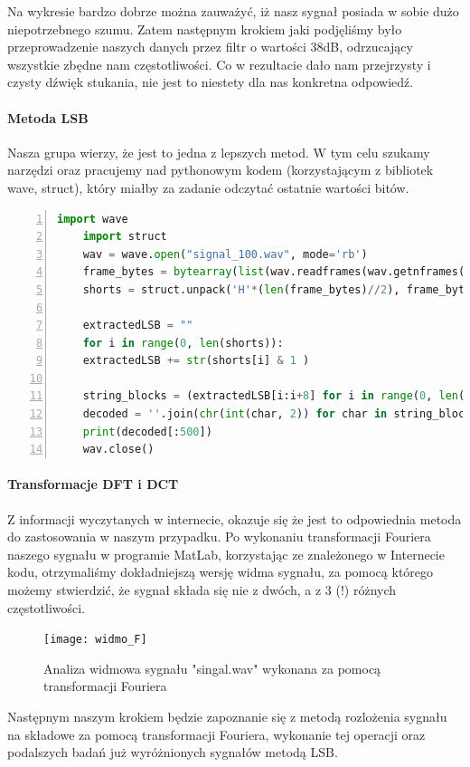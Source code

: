 \documentclass[a4paper,titleauthor]{mwart}
\begin{document}
	Na wykresie bardzo dobrze można zauważyć, iż nasz sygnał posiada w sobie dużo niepotrzebnego szumu. Zatem następnym krokiem jaki podjęliśmy było przeprowadzenie naszych danych przez filtr o wartości 38dB, odrzucający wszystkie zbędne nam częstotliwości. Co w rezultacie dało nam przejrzysty i czysty dźwięk stukania, nie jest to niestety dla nas konkretna odpowiedź. 
	
	\paragraph{Metoda LSB} Nasza grupa wierzy, że jest to jedna z lepszych metod. W tym celu szukamy narzędzi oraz pracujemy nad pythonowym kodem (korzystającym z bibliotek wave, struct), który miałby za zadanie odczytać ostatnie wartości bitów.
	
	\begin{lstlisting}[label=lst:wydruk,caption={Nasz dotychczasowy kod},language=Python,numbers=left]
	import wave
	import struct
	wav = wave.open("signal_100.wav", mode='rb')
	frame_bytes = bytearray(list(wav.readframes(wav.getnframes())))
	shorts = struct.unpack('H'*(len(frame_bytes)//2), frame_bytes)
	
	extractedLSB = ""
	for i in range(0, len(shorts)):
	extractedLSB += str(shorts[i] & 1 )
	
	string_blocks = (extractedLSB[i:i+8] for i in range(0, len(extractedLSB), 8))
	decoded = ''.join(chr(int(char, 2)) for char in string_blocks)
	print(decoded[:500])
	wav.close()
	\end{lstlisting}
	
	\paragraph{Transformacje DFT i DCT} Z informacji wyczytanych w internecie, okazuje się że jest to odpowiednia metoda do zastosowania w naszym przypadku. Po wykonaniu transformacji Fouriera naszego sygnału w programie MatLab, korzystając ze znależonego w Internecie kodu, otrzymaliśmy dokładniejszą wersję widma sygnału, za pomocą którego możemy stwierdzić, że sygnał składa się nie z dwóch, a z 3 (!) różnych częstotliwości.
	
	\begin{figure}[h]
		\centering
		\texttt{[image: widmo\_F]}
		\caption{Analiza widmowa sygnału "singal.wav" wykonana za pomocą transformacji Fouriera}
	\end{figure}
	
	Następnym naszym krokiem będzie zapoznanie się z metodą rozlożenia sygnału na składowe za pomocą transformacji Fouriera, wykonanie tej operacji oraz podalszych badań już wyróżnionych sygnałów metodą LSB.
	
\end{document}

